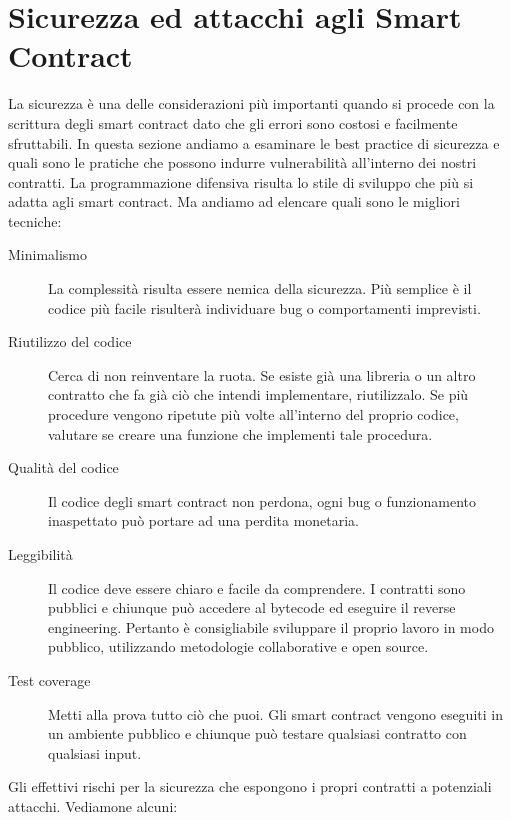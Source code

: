 \section{Sicurezza ed attacchi agli Smart Contract}
La sicurezza è una delle considerazioni più importanti quando si procede con la scrittura degli smart contract dato che gli errori sono costosi e facilmente sfruttabili. In questa sezione andiamo a esaminare le best practice di sicurezza e quali sono le pratiche che possono indurre vulnerabilità all'interno dei nostri contratti.
La programmazione difensiva risulta lo stile di sviluppo che più si adatta agli smart contract. Ma andiamo ad elencare quali sono le migliori tecniche:
\begin{description}
	\item[Minimalismo] La complessità risulta essere nemica della sicurezza. Più semplice è il codice più facile risulterà individuare bug o comportamenti imprevisti. 
	\item[Riutilizzo del codice] Cerca di non reinventare la ruota. Se esiste già una libreria o un altro contratto che fa già ciò che intendi implementare, riutilizzalo. Se più procedure vengono ripetute più volte all'interno del proprio codice, valutare se creare una funzione che implementi tale procedura.
	\item[Qualità del codice] Il codice degli smart contract non perdona, ogni bug o funzionamento inaspettato può portare ad una perdita monetaria.
	\item[Leggibilità] Il codice deve essere chiaro e facile da comprendere. I contratti sono pubblici e chiunque può accedere al bytecode ed eseguire il reverse engineering. Pertanto è consigliabile sviluppare il proprio lavoro in modo pubblico, utilizzando metodologie collaborative e open source.
	\item[Test coverage] Metti alla prova tutto ciò che puoi. Gli smart contract vengono eseguiti in un ambiente pubblico e chiunque può testare qualsiasi contratto con qualsiasi input.
\end{description}
Gli effettivi rischi per la sicurezza che espongono i propri contratti a potenziali attacchi. Vediamone alcuni:

